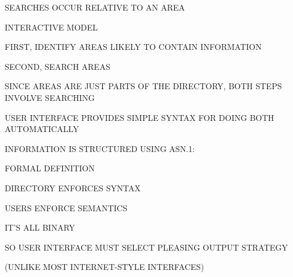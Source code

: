 \begin{bwslide}

\begin{nrtc}
\item	SEARCHES OCCUR RELATIVE TO AN AREA

\item	INTERACTIVE MODEL
    \begin{nrtc}
    \item	FIRST, IDENTIFY AREAS LIKELY TO CONTAIN INFORMATION

    \item	SECOND, SEARCH AREAS
    \end{nrtc}

\item	SINCE AREAS ARE JUST PARTS OF THE DIRECTORY,
	BOTH STEPS INVOLVE SEARCHING

\item	USER INTERFACE PROVIDES SIMPLE SYNTAX FOR DOING BOTH AUTOMATICALLY
\end{nrtc}
\end{bwslide}


\begin{bwslide}

\begin{nrtc}
\item	INFORMATION IS STRUCTURED USING ASN.1:
    \begin{nrtc}
    \item	FORMAL DEFINITION

    \item	DIRECTORY ENFORCES SYNTAX

    \item	USERS ENFORCE SEMANTICS
    \end{nrtc}

\item	IT'S ALL BINARY
    \begin{nrtc}
    \item	SO USER INTERFACE MUST SELECT PLEASING OUTPUT STRATEGY

    \item	(UNLIKE MOST INTERNET-STYLE INTERFACES)
    \end{nrtc}
\end{nrtc}
\end{bwslide}


